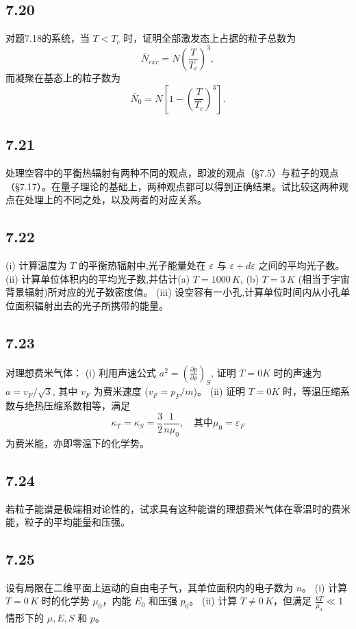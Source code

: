 \newpage
\subsection{7.20}
对题7.18的系统，当 $T < T_c$ 时，证明全部激发态上占据的粒子总数为
$$\overline{N}_{exc} = N \left( \frac{T}{T_c} \right)^3,$$
而凝聚在基态上的粒子数为
$$\overline{N}_0 = N \left[ 1 - \left( \frac{T}{T_c} \right)^3 \right].$$

\newpage
\subsection{7.21}
处理空容中的平衡热辐射有两种不同的观点，即波的观点（§7.5）与粒子的观点（§7.17）。在量子理论的基础上，两种观点都可以得到正确结果。试比较这两种观点在处理上的不同之处，以及两者的对应关系。

\newpage
\subsection{7.22}
(i) 计算温度为 $T$ 的平衡热辐射中,光子能量处在 $\varepsilon$ 与 $\varepsilon + d\varepsilon$ 之间的平均光子数。
(ii) 计算单位体积内的平均光子数,并估计(a) $T = 1000 \, K$, (b) $T = 3 \, K$ (相当于宇宙背景辐射)所对应的光子数密度值。
(iii) 设空容有一小孔,计算单位时间内从小孔单位面积辐射出去的光子所携带的能量。

\newpage
\subsection{7.23}
对理想费米气体：
(i) 利用声速公式 $a^2 = \left(\frac{\partial p}{\partial \rho}\right)_S$, 证明 $T = 0 K$ 时的声速为 $a = v_F/\sqrt{3}$, 其中 $v_F$ 为费米速度 ($v_F = p_F/m$)。
(ii) 证明 $T = 0 K$ 时，等温压缩系数与绝热压缩系数相等，满足
$$\kappa_T = \kappa_S = \frac{3}{2} \frac{1}{n\mu_0}, \quad 其中 \mu_0 = \varepsilon_F$$
为费米能，亦即零温下的化学势。

\newpage
\subsection{7.24}
若粒子能谱是极端相对论性的，试求具有这种能谱的理想费米气体在零温时的费米能，粒子的平均能量和压强。

\newpage
\subsection{7.25}
设有局限在二维平面上运动的自由电子气，其单位面积内的电子数为 $n$。
(i) 计算 $T=0 \, K$ 时的化学势 $\mu_0$，内能 $E_0$ 和压强 $p_0$。
(ii) 计算 $T \neq 0 \, K$，但满足 $\frac{kT}{\mu_0} \ll 1$ 情形下的 $\mu, E, S$ 和 $p$。

